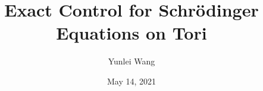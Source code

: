 \documentclass[12pt]{amsart}
\theoremstyle{definition}
\begin{document}
\title{Exact Control for Schr\"{o}dinger Equations on Tori}
\author{Yunlei Wang}
\date{May 14, 2021} 
\maketitle

\end{document}
